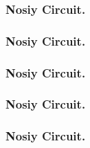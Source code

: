 \documentclass{beamer}
\begin{document}
\newcommand\DECSLIDE[2]{
\begin{frame}
\frametitle{Nosiy Circuit.}

\end{frame}
}


\DECSLIDE{test_test_correction_all_major_2_8-20_30x4.svg}{ Majoritiy }
\DECSLIDE{test_test_correction_by_colors_2_8-20_30x4.svg}{ Colors }
\DECSLIDE{test_test_correction_rand_2_8-20_30x4.svg}{ Picking Random }
\DECSLIDE{test_test_correction_by_SWIFT_2_8-20_30x4.svg}{ SWIFT }
\DECSLIDE{test_test_correction_by_MAX_2_8-20_30x4.svg}{ Max Color }


%
%
%
\end{document}
